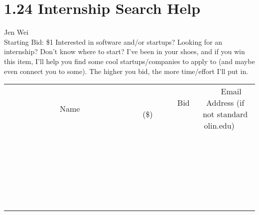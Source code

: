 \documentclass[11pt]{article}
\begin{document}
\section*{1.24 Internship Search Help}
Jen Wei
\\
Starting Bid: \$1
\newline
Interested in software and/or startups? Looking for an internship? Don't know where to start? I've been in your shoes, and if you win this item, I'll help you find some cool startups/companies to apply to (and maybe even connect you to some). The higher you bid, the more time/effort I'll put in.
\\[6ex]
\begin{tabular}{c c c}
~~~~~~~~~~~~~Name~~~~~~~~~~~~~ & ~~~~~~~~~Bid (\$)~~~~~~~~~  & ~~~Email Address (if not standard olin.edu)~~~\\
 & & \\
\hline
 & & \\
\hline
 & & \\
\hline
 & & \\
\hline
 & & \\
\hline
 & & \\
\hline
 & & \\
\hline
 & & \\
\hline
 & & \\
\hline
 & & \\
\hline
 & & \\
\hline
 & & \\
\hline
 & & \\
\hline
 & & \\
\hline
 & & \\
\hline
 & & \\
\hline
 & & \\
\hline
 & & \\
\hline
 & & \\
\hline
 & & \\
\hline
 & & \\
\hline
 & & \\
\hline
 & & \\
\hline
 & & \\
\hline
 & & \\
\hline
 & & \\
\hline
\end{tabular}
\newpage
\end{document}

